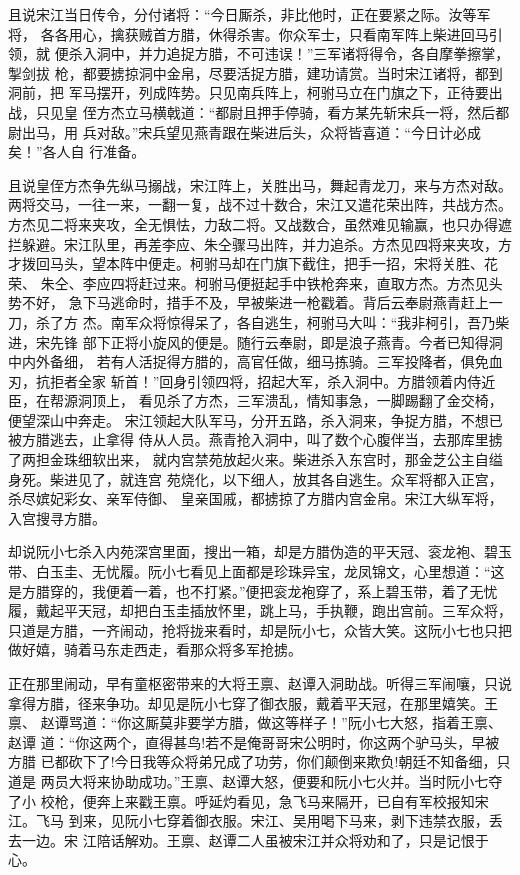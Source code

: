 且说宋江当日传令，分付诸将：“今日厮杀，非比他时，正在要紧之际。汝等军将，
各各用心，擒获贼首方腊，休得杀害。你众军士，只看南军阵上柴进回马引领，就
便杀入洞中，并力追捉方腊，不可违误！”三军诸将得令，各自摩拳擦掌，掣剑拔
枪，都要掳掠洞中金帛，尽要活捉方腊，建功请赏。当时宋江诸将，都到洞前，把
军马摆开，列成阵势。只见南兵阵上，柯驸马立在门旗之下，正待要出战，只见皇
侄方杰立马横戟道：“都尉且押手停骑，看方某先斩宋兵一将，然后都尉出马，用
兵对敌。”宋兵望见燕青跟在柴进后头，众将皆喜道：“今日计必成矣！”各人自
行准备。

且说皇侄方杰争先纵马搦战，宋江阵上，关胜出马，舞起青龙刀，来与方杰对敌。
两将交马，一往一来，一翻一复，战不过十数合，宋江又遣花荣出阵，共战方杰。
方杰见二将来夹攻，全无惧怯，力敌二将。又战数合，虽然难见输赢，也只办得遮
拦躲避。宋江队里，再差李应、朱仝骤马出阵，并力追杀。方杰见四将来夹攻，方
才拨回马头，望本阵中便走。柯驸马却在门旗下截住，把手一招，宋将关胜、花荣、
朱仝、李应四将赶过来。柯驸马便挺起手中铁枪奔来，直取方杰。方杰见头势不好，
急下马逃命时，措手不及，早被柴进一枪戳着。背后云奉尉燕青赶上一刀，杀了方
杰。南军众将惊得呆了，各自逃生，柯驸马大叫：“我非柯引，吾乃柴进，宋先锋
部下正将小旋风的便是。随行云奉尉，即是浪子燕青。今者已知得洞中内外备细，
若有人活捉得方腊的，高官任做，细马拣骑。三军投降者，俱免血刃，抗拒者全家
斩首！”回身引领四将，招起大军，杀入洞中。方腊领着内侍近臣，在帮源洞顶上，
看见杀了方杰，三军溃乱，情知事急，一脚踢翻了金交椅，便望深山中奔走。
宋江领起大队军马，分开五路，杀入洞来，争捉方腊，不想已被方腊逃去，止拿得
侍从人员。燕青抢入洞中，叫了数个心腹伴当，去那库里掳了两担金珠细软出来，
就内宫禁苑放起火来。柴进杀入东宫时，那金芝公主自缢身死。柴进见了，就连宫
苑烧化，以下细人，放其各自逃生。众军将都入正宫，杀尽嫔妃彩女、亲军侍御、
皇亲国戚，都掳掠了方腊内宫金帛。宋江大纵军将，入宫搜寻方腊。

却说阮小七杀入内苑深宫里面，搜出一箱，却是方腊伪造的平天冠、衮龙袍、碧玉
带、白玉圭、无忧履。阮小七看见上面都是珍珠异宝，龙凤锦文，心里想道：“这
是方腊穿的，我便着一着，也不打紧。”便把衮龙袍穿了，系上碧玉带，着了无忧
履，戴起平天冠，却把白玉圭插放怀里，跳上马，手执鞭，跑出宫前。三军众将，
只道是方腊，一齐闹动，抢将拢来看时，却是阮小七，众皆大笑。这阮小七也只把
做好嬉，骑着马东走西走，看那众将多军抢掳。

正在那里闹动，早有童枢密带来的大将王禀、赵谭入洞助战。听得三军闹嚷，只说
拿得方腊，径来争功。却见是阮小七穿了御衣服，戴着平天冠，在那里嬉笑。王禀、
赵谭骂道：“你这厮莫非要学方腊，做这等样子！”阮小七大怒，指着王禀、赵谭
道：“你这两个，直得甚鸟!若不是俺哥哥宋公明时，你这两个驴马头，早被方腊
已都砍下了!今日我等众将弟兄成了功劳，你们颠倒来欺负!朝廷不知备细，只道是
两员大将来协助成功。”王禀、赵谭大怒，便要和阮小七火并。当时阮小七夺了小
校枪，便奔上来戳王禀。呼延灼看见，急飞马来隔开，已自有军校报知宋江。飞马
到来，见阮小七穿着御衣服。宋江、吴用喝下马来，剥下违禁衣服，丢去一边。宋
江陪话解劝。王禀、赵谭二人虽被宋江并众将劝和了，只是记恨于心。

